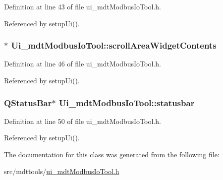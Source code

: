 Definition at line 43 of file ui\-\_\-mdt\-Modbus\-Io\-Tool.\-h.



Referenced by setup\-Ui().

\hypertarget{class_ui__mdt_modbus_io_tool_a624d93d5697ab5ba75269494cc888207}{
\subsubsection[{scroll\-Area\-Widget\-Contents}]{$\ast$ Ui\-\_\-mdt\-Modbus\-Io\-Tool\-::scroll\-Area\-Widget\-Contents}}\label{class_ui__mdt_modbus_io_tool_a624d93d5697ab5ba75269494cc888207}


Definition at line 46 of file ui\-\_\-mdt\-Modbus\-Io\-Tool.\-h.



Referenced by setup\-Ui().

\hypertarget{class_ui__mdt_modbus_io_tool_a067095b9a1197506ba66e11e40f195fb}{
\subsubsection[{statusbar}]{\setlength{\rightskip}{0pt plus 5cm}Q\-Status\-Bar$\ast$ Ui\-\_\-mdt\-Modbus\-Io\-Tool\-::statusbar}}\label{class_ui__mdt_modbus_io_tool_a067095b9a1197506ba66e11e40f195fb}


Definition at line 50 of file ui\-\_\-mdt\-Modbus\-Io\-Tool.\-h.



Referenced by setup\-Ui().



The documentation for this class was generated from the following file\-:\begin{DoxyCompactItemize}
\item 
src/mdttools/\hyperlink{ui__mdt_modbus_io_tool_8h}{ui\-\_\-mdt\-Modbus\-Io\-Tool.\-h}\end{DoxyCompactItemize}

